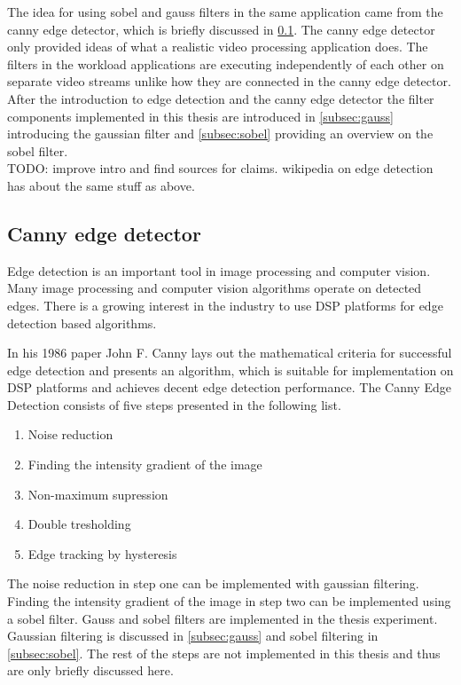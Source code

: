 The idea for using sobel and gauss filters in the same application came from
the canny edge detector, which is briefly discussed in \ref{subsec:canny}. The
canny edge detector only provided ideas of what a realistic video processing
application does. The filters in the workload applications are executing
independently of each other on separate video streams unlike how they are
connected in the canny edge detector. After the introduction to edge detection
and the canny edge detector the filter components implemented in this thesis are
introduced in \ref{subsec:gauss} introducing the gaussian filter and
\ref{subsec:sobel} providing an overview on the sobel filter.\\

TODO: improve intro and find sources for claims. wikipedia on edge detection has
about the same stuff as above.

\subsection{Canny edge detector}
\label{subsec:canny}
Edge detection is an important tool in image processing and computer vision.
Many image processing and computer vision algorithms operate on detected edges.
There is a growing interest in the industry to use DSP platforms for edge
detection based algorithms.

In his 1986 paper John F. Canny \cite{canny1986computational} lays out the
mathematical criteria for successful edge detection and presents an algorithm,
which is suitable for implementation on DSP platforms and achieves decent edge
detection performance. The Canny Edge Detection consists of five steps
presented in the following list.

\begin{enumerate}
    \item{Noise reduction}
    \item{Finding the intensity gradient of the image}
    \item{Non-maximum supression}
    \item{Double tresholding}
    \item{Edge tracking by hysteresis}
\end{enumerate}

The noise reduction in step one can be implemented with gaussian filtering.
Finding the intensity gradient of the image in step two can be implemented using
a sobel filter. Gauss and sobel filters are implemented in the thesis
experiment. Gaussian filtering is discussed in \ref{subsec:gauss} and sobel
filtering in \ref{subsec:sobel}.  The rest of the steps are not implemented in
this thesis and thus are only briefly discussed here.

